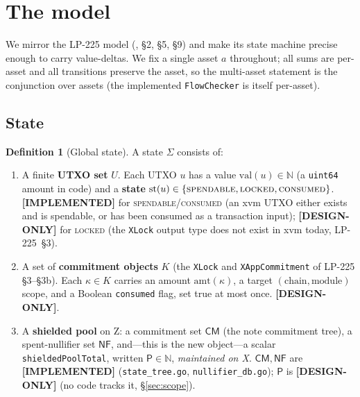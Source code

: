 \documentclass[11pt]{article}
\theoremstyle{definition}
\newtheorem{definition}{Definition}
\theoremstyle{remark}
\newcommand{\IMPL}{\textbf{[IMPLEMENTED]}}
\newcommand{\DESIGN}{\textbf{[DESIGN-ONLY]}}
\newcommand{\pool}{\mathsf{P}}
\newcommand{\NF}{\mathsf{NF}}
\newcommand{\CM}{\mathsf{CM}}
\begin{document}
\section{The model}
\label{sec:model}

We mirror the LP-225 model (\cite{lp225}, \S2, \S5, \S9) and make its
state machine precise enough to carry value-deltas. We fix a single asset
$a$ throughout; all sums are per-asset and all transitions preserve the
asset, so the multi-asset statement is the conjunction over assets (the
implemented \texttt{FlowChecker} is itself per-asset).

\subsection{State}

\begin{definition}[Global state]
\label{def:state}
A state $\Sigma$ consists of:
\begin{enumerate}[leftmargin=2em,nosep]
\item A finite \textbf{UTXO set} $U$. Each UTXO $u$ has a value
  $\mathrm{val}(u)\in\mathbb{N}$ (a \texttt{uint64} amount in code) and a
  \textbf{state} $\mathrm{st}(u)\in\{\textsc{spendable},\textsc{locked},
  \textsc{consumed}\}$. \IMPL{} for \textsc{spendable}/\textsc{consumed}
  (an xvm UTXO either exists and is spendable, or has been consumed as a
  transaction input); \DESIGN{} for \textsc{locked} (the \texttt{XLock}
  output type does not exist in xvm today, LP-225~\S3).
\item A set of \textbf{commitment objects} $K$ (the \texttt{XLock} and
  \texttt{XAppCommitment} of LP-225 \S3--\S3b). Each $\kappa\in K$ carries
  an amount $\mathrm{amt}(\kappa)$, a target $(\mathrm{chain},
  \mathrm{module})$ scope, and a Boolean \texttt{consumed} flag, set true
  at most once. \DESIGN{}.
\item A \textbf{shielded pool} on Z: a commitment set $\CM$ (the note
  commitment tree), a spent-nullifier set $\NF$, and---this is the new
  object---a scalar \texttt{shieldedPoolTotal}, written $\pool\in\mathbb{N}$,
  \emph{maintained on X}. $\CM,\NF$ are \IMPL{}
  (\texttt{state\_tree.go}, \texttt{nullifier\_db.go}); $\pool$ is
  \DESIGN{} (no code tracks it, \S\ref{sec:scope}).
\end{enumerate}
\end{definition}
\end{document}
